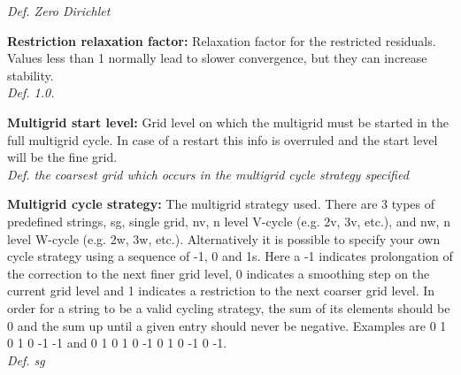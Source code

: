 \documentclass[12pt,epsf,colordvi]{article}
\begin{document}
\begin{description}
{\it Def.  Zero Dirichlet}
%
      \item{\bf Restriction relaxation factor:} Relaxation factor for the restricted residuals. Values less than 1 normally lead to slower convergence, but they can increase stability. \\
{\it Def.  1.0. }
%
       \item{\bf  Multigrid start level:} Grid level on which the multigrid must be started in the full multigrid cycle. In case of a restart this info is overruled and the start level will be the fine grid. 
\\
{\it Def. the coarsest grid which occurs in the multigrid cycle strategy specified}
%
       \item{\bf  Multigrid cycle strategy:} The multigrid strategy used. There are 3 types of predefined strings, sg, single grid, nv, n level V-cycle (e.g. 2v, 3v, etc.), and nw, n level W-cycle (e.g. 2w, 3w, etc.). Alternatively it is possible to specify your own cycle strategy using a sequence of -1, 0 and 1s. Here a -1 indicates prolongation of the correction to the next finer grid level, 0 indicates a smoothing step on the current grid level and 1 indicates a restriction to the next coarser grid level. In order for a string to be a valid cycling strategy, the sum of its elements should be 0 and the sum up until a given entry should never be negative. Examples are 0 1 0 1 0 -1 -1 and 0 1 0 1 0 -1 0 1 0 -1 0 -1. \\
{\it Def. sg}
% 
\end{description}
%
\noindent 
\end{document}

